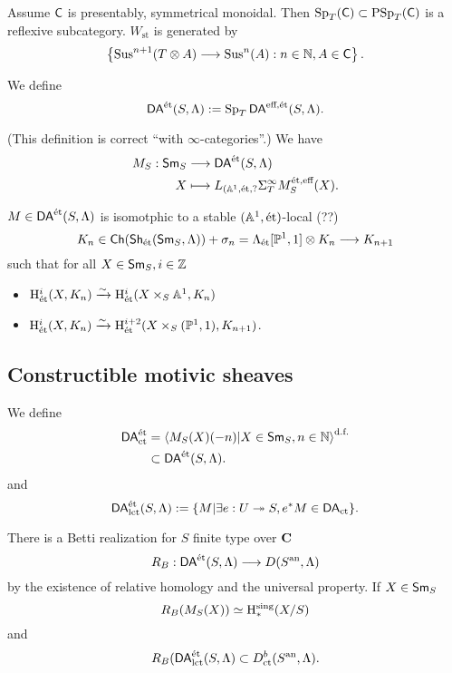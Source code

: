 \begin{proposition}
Assume $\mathsf{C}$ is presentably, symmetrical monoidal. Then $\operatorname{Sp}_T(\mathsf{C})\subset \operatorname{PSp}_T(\mathsf{C})$ is a
reflexive subcategory. $W_{\text{st}}$ is generated by
\[
\left\{ \Sus^{n+1}(T\otimes A) \to \Sus^{n}(A):n\in \N,A\in \C \right\} .
\]
\end{proposition}
\begin{definition}
We define
\[
\mathsf{DA}^\text{\'et}(S,\Lambda) := \operatorname{Sp}_T\mathsf{DA}^{\text{eff},\text{\'et}}(S,\Lambda).
\] 	
\end{definition}
(This definition is correct ``with $\infty$-categories''.)
We have
\begin{align*}
M_S: \mathsf{Sm}_S &\longrightarrow \mathsf{DA}^\text{\'et}(S,\Lambda) \\
X &\longmapsto L_{(\mathbb A^{1},\text{\'et},?}\Sigma_T^{\infty}M_S^{\text{\'et},\text{eff}}(X)
.
\end{align*}
\begin{remark}
$M\in \mathsf{DA}^\text{\'et}(S,\Lambda)$ is isomotphic to a stable $(\mathbb A^{1},\text{\'et})$-local (??)
\[
K_n\in \Ch(\Sh_{\text{\'et}}(\Sm_S,\Lambda)) + \sigma_n =
\Lambda_{\text{\'et}}[\P^{1},1]\otimes K_n\to K_{n+1}
\]
such that for all $X\in \mathsf{Sm}_S,i \in \mathbb Z$
\begin{itemize}
\item $\mathrm{H}_{\text{\'et}}^{i}(X,K_n)\xrightarrow{\sim} \mathrm{H}_{\text{\'et}}^{i}(X\times_S\mathbb A^{1},K_n)$
\item $\mathrm{H}_{\text{\'et}}^{i}(X,K_n) \xrightarrow{\sim} \mathrm{H}_{\text{\'et}}^{i+2}(X\times_S(\mathbb{P}^{1},1),K_{n+1})$.
\end{itemize}
\end{remark}

\subsection{Constructible motivic sheaves}
\begin{definition}
We define 
\begin{align*}
\mathsf{DA}^\text{\'et}_{\text{ct}} &= \left<M_S(X)(-n)|X\in \mathsf{Sm}_S,n\in \mathbb N \right>^{\text{d.f.}} \\
&\subset \mathsf{DA}^\text{\'et}(S,\Lambda).
\end{align*}
and 
\[
\mathsf{DA}^\text{\'et}_{\text{lct}}(S,\Lambda) := \{M|\exists e:U\twoheadrightarrow S, e^{*}M\in \mathsf{DA}_{\text{ct}}\} .
\]
\end{definition}
There is a Betti realization for $S$ finite type over $\mathbf{C}$
\[
R_B: \DAet(S,\Lambda) \to D(S\an,\Lambda)
\]
by the existence of relative homology and the universal property. If $X\in \mathsf{Sm}_S$
\[
R_B(M_S(X)) \simeq \mathrm{H}_*^{\text{sing}}(X /S)
\]
and
\[
R_B(\mathsf{DA}^\text{\'et}_{\text{lct}}(S,\Lambda) \subset D^{b}_{\text{ct}}(S^\text{an},\Lambda).
\]

